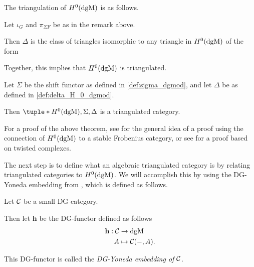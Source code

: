 The triangulation of \( H^0(\operatorname{dgM}) \) is as follows.
\begin{definition}
    \label{def:delta_H_0_dgmod}
    Let \( \iota_G \) and \( \pi_{\Sigma F} \) be as in the remark above.

    Then \( \Delta \) is the class of triangles isomorphic to any triangle in \( H^0(\operatorname{dgM}) \) of the form
    \begin{center}
    \end{center}
\end{definition}

Together, this implies that \( H^0(\operatorname{dgM}) \) is triangulated.
\begin{theorem}
    Let \( \Sigma \) be the shift functor as defined in \autoref{def:sigma_dgmod}, and let \( \Delta \) be as defined in \autoref{def:delta_H_0_dgmod}.

    Then \( \tuple*{H^0(\dgM), \Sigma, \Delta} \) is a triangulated category.
\end{theorem}
For a proof of the above theorem, see \cite[p.\ 31]{Jasso-Muro_2023} for the general idea of a proof using the connection of \( H^0(\operatorname{dgM}) \) to a stable Frobenius category, or see \cite[Proposition 2, p.\ 97]{Bondal--Kapranov_1991} for a proof based on twisted complexes.

The next step is to define what an algebraic triangulated category is by relating triangulated categories to \( H^0(\operatorname{dgM}) \). We will accomplish this by using the DG-Yoneda embedding from \cite[Corollary 6.3.6]{Borceux_1994}, which is defined as follows.
\begin{definition}
    \label{def:DG_Yoneda_embedding}
    Let \( {\mathcal{C}} \) be a small DG-category.
    
    Then let \( \mathbf{h} \) be the DG-functor defined as follows
    \begin{align*}
        \mathbf{h}: {\mathcal{C}} &\to \operatorname{dgM} \\
        A &\mapsto {\mathcal{C}}(-, A).
    \end{align*}

    This DG-functor is called the \emph{DG-Yoneda embedding of \( {\mathcal{C}} \)}.
\end{definition}

